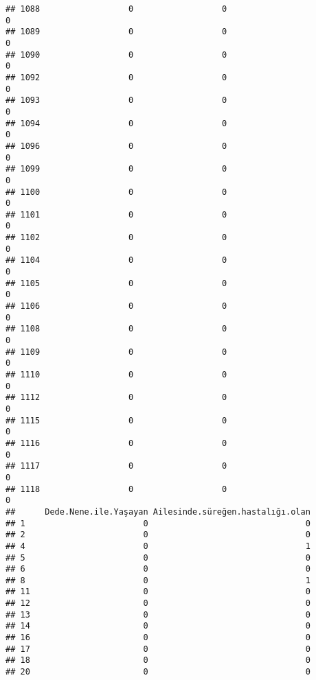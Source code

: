 \documentclass[
]{article}
\begin{document}
\begin{verbatim}
## 1088                  0                  0                              0
## 1089                  0                  0                              0
## 1090                  0                  0                              0
## 1092                  0                  0                              0
## 1093                  0                  0                              0
## 1094                  0                  0                              0
## 1096                  0                  0                              0
## 1099                  0                  0                              0
## 1100                  0                  0                              0
## 1101                  0                  0                              0
## 1102                  0                  0                              0
## 1104                  0                  0                              0
## 1105                  0                  0                              0
## 1106                  0                  0                              0
## 1108                  0                  0                              0
## 1109                  0                  0                              0
## 1110                  0                  0                              0
## 1112                  0                  0                              0
## 1115                  0                  0                              0
## 1116                  0                  0                              0
## 1117                  0                  0                              0
## 1118                  0                  0                              0
##      Dede.Nene.ile.Yaşayan Ailesinde.süreğen.hastalığı.olan
## 1                        0                                0
## 2                        0                                0
## 4                        0                                1
## 5                        0                                0
## 6                        0                                0
## 8                        0                                1
## 11                       0                                0
## 12                       0                                0
## 13                       0                                0
## 14                       0                                0
## 16                       0                                0
## 17                       0                                0
## 18                       0                                0
## 20                       0                                0

\end{verbatim}
\end{document}
